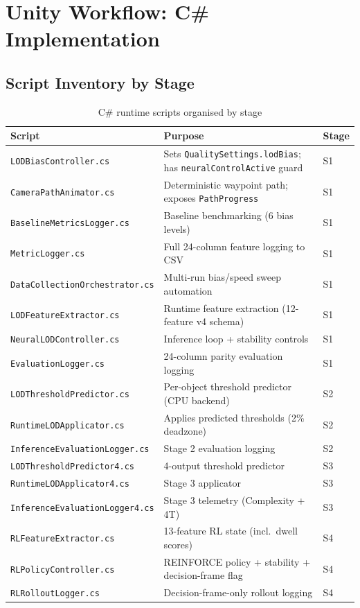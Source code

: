 \documentclass[12pt, a4paper]{article}
\begin{document}
\section{Unity Workflow: C\# Implementation}
\label{sec:unity}

\subsection{Script Inventory by Stage}

\begin{table}[H]
\centering
\caption{C\# runtime scripts organised by stage}
\label{tab:csharp}
\begin{tabularx}{\textwidth}{l X l}
\toprule
Script & Purpose & Stage\\
\midrule
\texttt{LODBiasController.cs} & Sets \texttt{QualitySettings.lodBias}; has
  \texttt{neuralControlActive} guard & S1\\
\texttt{CameraPathAnimator.cs} & Deterministic waypoint path; exposes
  \texttt{PathProgress} & S1\\
\texttt{BaselineMetricsLogger.cs} & Baseline benchmarking (6 bias levels) & S1\\
\texttt{MetricLogger.cs} & Full 24-column feature logging to CSV & S1\\
\texttt{DataCollectionOrchestrator.cs} & Multi-run bias/speed sweep automation & S1\\
\texttt{LODFeatureExtractor.cs} & Runtime feature extraction (12-feature v4 schema) & S1\\
\texttt{NeuralLODController.cs} & Inference loop + stability controls & S1\\
\texttt{EvaluationLogger.cs} & 24-column parity evaluation logging & S1\\
\texttt{LODThresholdPredictor.cs} & Per-object threshold predictor (CPU backend) & S2\\
\texttt{RuntimeLODApplicator.cs} & Applies predicted thresholds (2\% deadzone) & S2\\
\texttt{InferenceEvaluationLogger.cs} & Stage 2 evaluation logging & S2\\
\texttt{LODThresholdPredictor4.cs} & 4-output threshold predictor & S3\\
\texttt{RuntimeLODApplicator4.cs} & Stage 3 applicator & S3\\
\texttt{InferenceEvaluationLogger4.cs} & Stage 3 telemetry (Complexity + 4T) & S3\\
\texttt{RLFeatureExtractor.cs} & 13-feature RL state (incl.\ dwell scores) & S4\\
\texttt{RLPolicyController.cs} & REINFORCE policy + stability + decision-frame flag & S4\\
\texttt{RLRolloutLogger.cs} & Decision-frame-only rollout logging & S4\\
\bottomrule
\end{tabularx}
\end{table}
\end{document}

